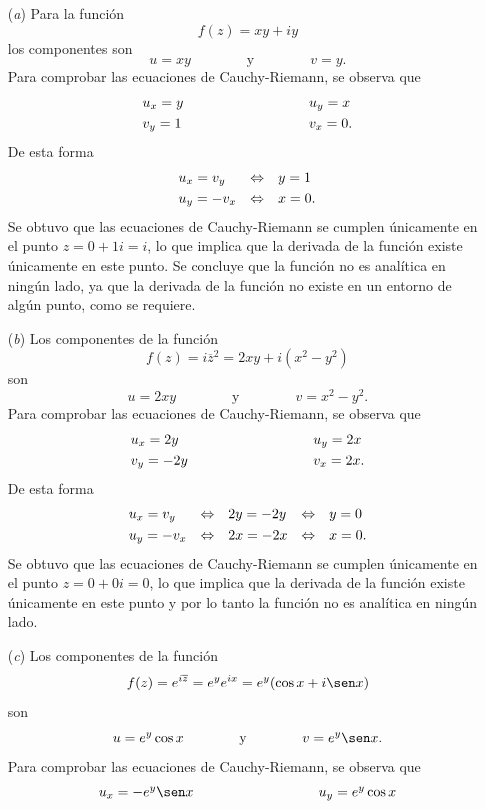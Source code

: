 \documentclass[a4paper]{report}
\begin{document}
\begin{enumerate}
 \item[(\textit{a})] Para la función 
 \[
  f(z)=xy+iy
 \]
 los componentes son 
 \[
  u=xy
  \qquad\qquad\textrm{y}\qquad\qquad
  v=y.
 \]
 Para comprobar las ecuaciones de Cauchy-Riemann, se observa que 
 \[
 \begin{array}{ll}
  u_x=y\qquad\qquad\qquad\qquad&u_y=x\\[\smallskipamount]
  v_y=1\qquad\qquad\qquad\qquad&v_x=0.
 \end{array}
 \]
 De esta forma
 \[
 \begin{array}{lll}
  u_x=v_y&\Leftrightarrow&y=1\\[\smallskipamount]
  u_y=-v_x&\Leftrightarrow&x=0.
 \end{array}
 \] 
 Se obtuvo que las ecuaciones de Cauchy-Riemann se cumplen únicamente en el punto \(z=0+1i=i\), lo que implica que la derivada de la función existe únicamente en este punto. Se concluye que la función no es analítica en ningún lado, ya que la derivada de la función no existe en un entorno de algún punto, como se requiere.
  \item[(\textit{b})] Los componentes de la función 
 \[
  f(z)=i\overline{z}^2=2xy+i(x^2-y^2)
 \]
 son 
 \[
  u=2xy
  \qquad\qquad\textrm{y}\qquad\qquad
  v=x^2-y^2.
 \]
 Para comprobar las ecuaciones de Cauchy-Riemann, se observa que 
 \[
 \begin{array}{ll}
  u_x=2y\qquad\qquad\qquad\qquad&u_y=2x\\[\smallskipamount]
  v_y=-2y\qquad\qquad\qquad\qquad&v_x=2x.
 \end{array}
 \]
 De esta forma
 \[
 \begin{array}{lllll}
  u_x=v_y&\Leftrightarrow&2y=-2y&\Leftrightarrow&y=0\\[\smallskipamount]
  u_y=-v_x&\Leftrightarrow&2x=-2x&\Leftrightarrow&x=0.
 \end{array}
 \] 
 Se obtuvo que las ecuaciones de Cauchy-Riemann se cumplen únicamente en el punto \(z=0+0i=0\), lo que implica que la derivada de la función existe únicamente en este punto y por lo tanto la función no es analítica en ningún lado.
 \item[(\textit{c})] Los componentes de la función 
 \[
  f(z)=e^{i\overline{z}}=e^{y}e^{ix}=e^y(\cos x+i\sen x)
 \]
 son 
 \[
  u=e^y\cos x
  \qquad\qquad\textrm{y}\qquad\qquad
  v=e^y\sen x.
 \]
 Para comprobar las ecuaciones de Cauchy-Riemann, se observa que 
 \[
 \begin{array}{ll}
  u_x=-e^y\sen x\qquad\qquad\qquad\qquad&u_y=e^y\cos x\\[\smallskipamount]

\end{array}\]
\end{enumerate}
\end{document}
